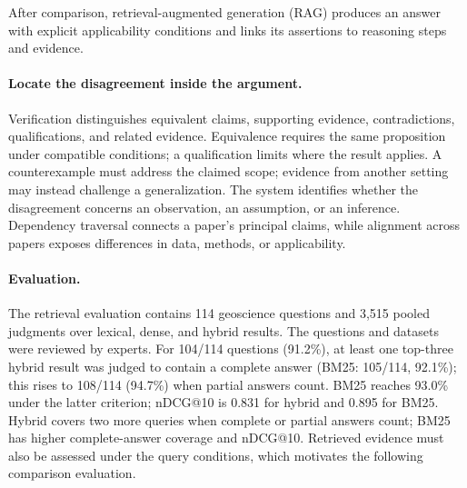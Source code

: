 \documentclass[sigconf,screen,review]{acmart}
\begin{document}
After comparison, retrieval-augmented generation (RAG) produces an answer with explicit applicability conditions and links its assertions to reasoning steps and evidence.

\paragraph{Locate the disagreement inside the argument.}
Verification distinguishes equivalent claims, supporting evidence, contradictions, qualifications, and related evidence. Equivalence requires the same proposition under compatible conditions; a qualification limits where the result applies. A counterexample must address the claimed scope; evidence from another setting may instead challenge a generalization. The system identifies whether the disagreement concerns an observation, an assumption, or an inference. Dependency traversal connects a paper's principal claims, while alignment across papers exposes differences in data, methods, or applicability.

\paragraph{Evaluation.}
The retrieval evaluation contains 114 geoscience questions and 3,515 pooled judgments over lexical, dense, and hybrid results. The questions and datasets were reviewed by experts. For 104/114 questions (91.2\%), at least one top-three hybrid result was judged to contain a complete answer (BM25: 105/114, 92.1\%); this rises to 108/114 (94.7\%) when partial answers count. BM25 reaches 93.0\% under the latter criterion; nDCG@10 is 0.831 for hybrid and 0.895 for BM25. Hybrid covers two more queries when complete or partial answers count; BM25 has higher complete-answer coverage and nDCG@10. Retrieved evidence must also be assessed under the query conditions, which motivates the following comparison evaluation.
\end{document}
